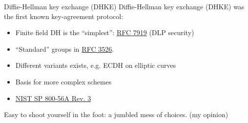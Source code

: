 \begin{frame}{Diffie-Hellman key exchange (DHKE)}
  Diffie-Hellman key exchange (DHKE) was the first known key-agreement protocol:
  \begin{itemize}[<+(1)->]
    \item Finite field DH is the \enquote{simplest}: \href{https://datatracker.ietf.org/doc/html/rfc7919}{RFC 7919} (DLP security)
    \item \enquote{Standard} groups in \href{https://datatracker.ietf.org/doc/html/rfc3526}{RFC 3526}.
    \item Different variants exists, e.g. ECDH on elliptic curves
    \item Basis for more complex schemes
    \item \href{https://csrc.nist.gov/pubs/sp/800/56/a/r3/final}{NIST SP 800-56A Rev. 3}
  \end{itemize}

  \pause
  Easy to shoot yourself in the foot: a jumbled mess of choices. (my opinion)
\end{frame}

